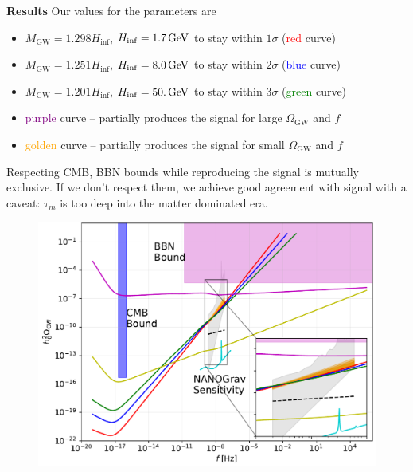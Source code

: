 \documentclass{beamer}                             %
\newcommand{\blocktitle}[1]{{\Large \textbf{#1}}}
\newcommand{\GeV}{\,{\rm GeV}}
\begin{document}
\begin{frame}[t]
\begin{columns}[T]
\begin{column}{0.30\textwidth}
    \begin{tcolorbox}
    \blocktitle{Results}
    Our values for the parameters are 
    \begin{itemize}
        \item $M_{\text{GW}} = 1.298H_{\inf}$, $H_{\inf} =  1.7 \GeV$ to stay within $1\sigma$ (\textcolor{red}{red} curve)
        \item $M_{\text{GW}} = 1.251H_{\inf}$, $H_{\inf} = 8.0 \GeV$ to stay within $2\sigma$ (\textcolor{blue}{blue} curve)
        \item $M_{\text{GW}} = 1.201H_{\inf}$, $H_{\inf} = 50. \GeV$ to stay within $3\sigma$ (\textcolor{green}{green} curve)
        \item \textcolor{purple}{purple} curve -- partially produces the signal for large $\Omega_{\text{GW}}$ and $f$
        \item \textcolor{orange}{golden} curve -- partially produces the signal for small $\Omega_{\text{GW}}$ and $f$
    \end{itemize}
   Respecting CMB, BBN bounds while reproducing the signal is mutually exclusive. If we don't respect them, we achieve good agreement with signal with a caveat: $\tau_m$ is too deep into the matter dominated era.
   \vspace{-0cm}
     \begin{figure}[t]
        \centering
          \includegraphics[width=.9\linewidth]{fig5-cropped.pdf} 

          \label{fig:contours}
        \end{figure}
  \end{tcolorbox}
  
\end{column}


\end{columns}
\end{frame}
\end{document}
